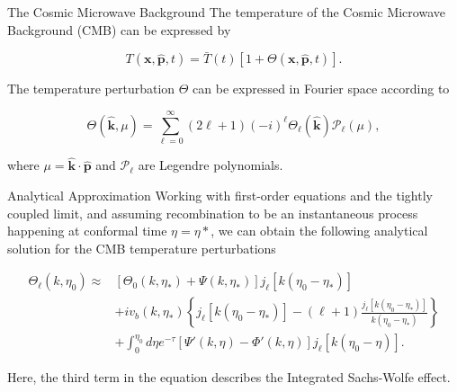\documentclass[serif, aspectratio=169]{beamer}
\begin{document}
\begin{frame}{The Cosmic Microwave Background}
    The temperature of the Cosmic Microwave Background (CMB) can be expressed by

    \begin{equation}\label{eq:temp_def}
        T(\mathbf{x}, \hat{\mathbf{p}}, t)=\bar{T}(t)[1+\Theta(\mathbf{x}, \hat{\mathbf{p}}, t)].
    \end{equation}

    The temperature perturbation $\Theta$ can be expressed in Fourier space according to

    \begin{equation}\label{eq:Theta_expand}
        \Theta(\hat{\mathbf{k}}, \mu)=\sum_{\ell=0}^\infty (2\ell+1)(-i)^\ell \Theta_\ell(\hat{\mathbf{k}})\mathcal{P}_\ell(\mu),
    \end{equation}

    where $\mu=\hat{\mathbf{k}}\cdot \hat{\mathbf{p}}$ and $\mathcal{P}_\ell$ are Legendre polynomials.

\end{frame}

\begin{frame}{Analytical Approximation}
Working with first-order equations and the tightly coupled limit, and assuming recombination to be an instantaneous process happening at conformal time $\eta=\eta*$, we can obtain the following analytical solution for the CMB temperature perturbations

\begin{equation}\label{Thetal_approx}
\begin{split}
    \Theta_\ell(k,\eta_0)\approx &[\Theta_0(k,\eta_*)+\Psi(k,\eta_*)]j_\ell[k(\eta_0-\eta_*)]\\
    &+iv_b(k,\eta_*)\left\{j_\ell[k(\eta_0-\eta_*)]-(\ell+1)\frac{j_\ell[k(\eta_0-\eta_*)]}{k(\eta_0-\eta_*)}\right\}\\
    &+\int_0^{\eta_0} d\eta e^{-\tau}[\Psi'(k,\eta)-\Phi'(k,\eta)]j_\ell[k(\eta_0-\eta)].
\end{split}
\end{equation}

Here, the third term in the equation describes the Integrated Sachs-Wolfe effect.
\end{frame}
\end{document}
